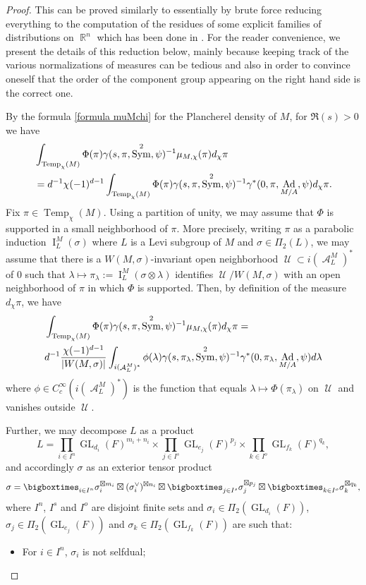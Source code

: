 \documentclass[12pt]{article}
\numberwithin{equation}{section}
\DeclareMathOperator{\Temp}{Temp}
\DeclareMathOperator{\Ad}{Ad}
\DeclareMathOperator{\cA}{\mathcal{A}}
\DeclareMathOperator{\bR}{\mathbb{R}}
\DeclareMathOperator{\cU}{\mathcal{U}}
\DeclareMathOperator{\Sym}{Sym}
\DeclareMathOperator{\GL}{\mathrm{GL}}
\DeclareMathOperator{\rI}{\mathrm{I}}
\begin{document}
	\begin{proof}
		This can be proved similarly to \cite[Proposition 3.41]{BPPlanch} essentially by brute force reducing everything to the computation  of the residues of some explicit families of distributions on $\bR^n$ which has been done in \cite[Proposition 3.31]{BPPlanch}. For the reader convenience, we present the details of this reduction below, mainly because keeping track of the various normalizations of measures can be tedious and also in order to convince oneself that the order of the component group appearing on the right hand side is the correct one.
		
		By the formula \eqref{formula muMchi} for the Plancherel density of $M$, for $\Re(s)>0$ we have
		\[\begin{aligned}
			\displaystyle & \int_{\Temp_\chi(M)} \Phi(\pi) \gamma(s,\pi,\Sym^2,\psi)^{-1} \mu_{M,\chi}(\pi)d_\chi\pi \\
			& =d^{-1}\chi(-1)^{d-1}\int_{\Temp_\chi(M)} \Phi(\pi) \gamma(s,\pi,\Sym^2,\psi)^{-1} \gamma^*(0,\pi, \Ad_{M/A},\psi)d_\chi\pi.
		\end{aligned}\]
		Fix $\pi\in \Temp_\chi(M)$. Using a partition of unity, we may assume that $\Phi$ is supported in a small neighborhood of $\pi$. More precisely, writing $\pi$ as a parabolic induction $\rI_L^M(\sigma)$ where $L$ is a Levi subgroup of $M$ and $\sigma\in \Pi_2(L)$, we may assume that there is a $W(M,\sigma)$-invariant open neighborhood $\cU\subset i(\cA_L^M)^*$ of $0$ such that $\lambda\mapsto \pi_\lambda:=\rI_L^M(\sigma\otimes \lambda)$ identifies $\cU/W(M,\sigma)$ with an open neighborhood of $\pi$ in which $\Phi$ is supported. Then, by definition of the measure $d_\chi\pi$, we have
		\begin{align}\label{eq8}
			\displaystyle & \int_{\Temp_\chi(M)} \Phi(\pi) \gamma(s,\pi,\Sym^2,\psi)^{-1} \mu_{M,\chi}(\pi)d_\chi\pi= \\
			\nonumber & d^{-1}\frac{\chi(-1)^{d-1}}{\lvert W(M,\sigma)\rvert}\int_{i(\cA_L^M)^*} \phi(\lambda) \gamma(s,\pi_\lambda,\Sym^2,\psi)^{-1} \gamma^*(0,\pi_\lambda, \Ad_{M/A},\psi)d\lambda
		\end{align}
		where $\phi\in C_c^\infty(i(\cA_L^M)^*)$ is the function that equals $\lambda\mapsto \Phi(\pi_\lambda)$ on $\cU$ and vanishes outside $\cU$.
		
		Further, we may decompose $L$ as a product
		$$\displaystyle L= \prod_{i\in I^n} \GL_{d_i}(F)^{m_i+n_i}\times \prod_{j\in I^s} \GL_{e_j}(F)^{p_j}\times \prod_{k\in I^o} \GL_{f_k}(F)^{q_k},$$
		and accordingly $\sigma$ as an exterior tensor product
		$$\displaystyle \sigma= \bigboxtimes_{i\in I^n} \sigma_i^{\boxtimes m_i}\boxtimes (\sigma_i^\vee)^{\boxtimes n_i} \boxtimes \bigboxtimes_{j\in I^s} \sigma_j^{\boxtimes p_j}\boxtimes \bigboxtimes_{k\in I^o} \sigma_k^{\boxtimes q_k},$$
		where $I^n$, $I^s$ and $I^o$ are disjoint finite sets and $\sigma_i\in \Pi_2(\GL_{d_i}(F))$, $\sigma_j\in \Pi_2(\GL_{e_j}(F))$ and $\sigma_k\in \Pi_2(\GL_{f_k}(F))$ are such that:
		\begin{itemize}
			\item For $i\in I^n$, $\sigma_i$ is not selfdual;
			

\end{itemize}
\end{proof}
\end{document}
